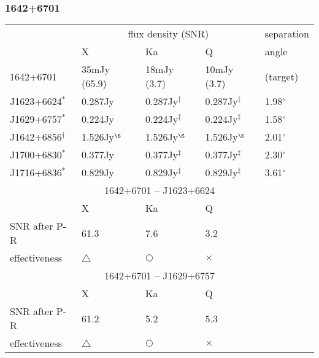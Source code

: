 \subsubsection{
  1642+6701
}
\begin{tabular}{p{30mm}|p{30mm}|p{30mm}|p{30mm}|p{20mm}}
\hline
                 & \multicolumn{3}{c|}{flux density (SNR)}
                 & separation \\
\cline{2-4}
                 & X
                 & Ka
                 & Q
                 & angle \\
\hline
1642+6701        &  35mJy (65.9)
                 &  18mJy (3.7)
                 &  10mJy (3.7)
                 & (target)   \\
\hline
J1623+6624$^*$   & 0.287Jy
                 & 0.287Jy$^\ddag$
                 & 0.287Jy$^\ddag$
                 & 1.98$^\circ$ \\
\hline
J1629+6757$^*$   & 0.224Jy
                 & 0.224Jy$^\ddag$
                 & 0.224Jy$^\ddag$
                 & 1.58$^\circ$ \\
\hline
J1642+6856$^\dag$& 1.526Jy$^\S$
                 & 1.526Jy$^\S$
                 & 1.526Jy$^\S$
                 & 2.01$^\circ$ \\
\hline
J1700+6830$^*$   & 0.377Jy
                 & 0.377Jy$^\ddag$
                 & 0.377Jy$^\ddag$
                 & 2.30$^\circ$ \\
\hline
J1716+6836$^*$   & 0.829Jy
                 & 0.829Jy$^\ddag$
                 & 0.829Jy$^\ddag$
                 & 3.61$^\circ$ \\
\hline
\hline
\multicolumn{5}{c}{1642+6701 -- J1623+6624}         \\
\hline
              &  X          & Ka         & \multicolumn{2}{l}{Q}       \\
\hline
SNR after P-R & 61.3        & 7.6        & \multicolumn{2}{l}{3.2}     \\
\hline
effectiveness & $\triangle$ & $\bigcirc$ & \multicolumn{2}{l}{$\times$}\\
\hline
\hline
\multicolumn{5}{c}{1642+6701 -- J1629+6757}         \\
\hline
              &  X          & Ka         & \multicolumn{2}{l}{Q}       \\
\hline
SNR after P-R & 61.2        & 5.2        & \multicolumn{2}{l}{5.3}     \\
\hline
effectiveness & $\triangle$ & $\bigcirc$ & \multicolumn{2}{l}{$\times$}\\

\end{tabular}
